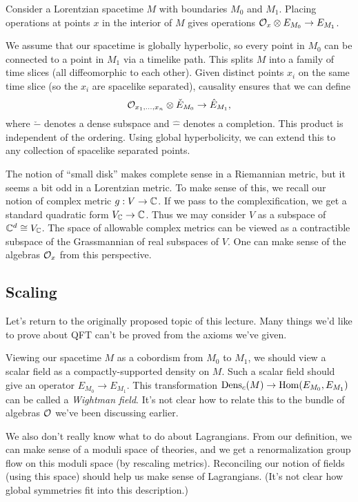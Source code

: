 Consider a Lorentzian spacetime $M$ with boundaries $M_0$ and $M_1$.
Placing operations at points $x$ in the interior of $M$ gives operations $\mathcal{O}_x \otimes E_{M_0} \to E_{M_1}$.

We assume that our spacetime is globally hyperbolic, so every point in $M_0$ can be connected to a point in $M_1$ via a timelike path.
This splits $M$ into a family of time slices (all diffeomorphic to each other).
Given distinct points $x_i$ on the same time slice (so the $x_i$ are spacelike separated), causality ensures that we can define
\[
	\mathcal{O}_{x_1, \dots, x_n} \otimes \check{E}_{M_0} \to \hat{E}_{M_1},
\]
where $\check{-}$ denotes a dense subspace and $\hat{-}$ denotes a completion.
This product is independent of the ordering.
Using global hyperbolicity, we can extend this to any collection of spacelike separated points.

The notion of ``small disk'' makes complete sense in a Riemannian metric, but it seems a bit odd in a Lorentzian metric.
To make sense of this, we recall our notion of complex metric $g: V \to \mathbb{C}$.
If we pass to the complexification, we get a standard quadratic form $V_{\mathbb{C}} \to \mathbb{C}$.
Thus we may consider $V$ as a subspace of $\mathbb{C}^d \cong V_{\mathbb{C}}$.
The space of allowable complex metrics can be viewed as a contractible subspace of the Grassmannian of real subspaces of $V$.
One can make sense of the algebras $\mathcal{O}_x$ from this perspective.

\subsection{Scaling}

Let's return to the originally proposed topic of this lecture.
Many things we'd like to prove about QFT can't be proved from the axioms we've given.

Viewing our spacetime $M$ as a cobordism from $M_0$ to $M_1$, we should view a scalar field as a compactly-supported density on $M$.
Such a scalar field should give an operator $E_{M_0} \to E_{M_1}$.
This transformation $\operatorname{Dens}_c(M) \to \operatorname{Hom}(E_{M_0}, E_{M_1})$ can be called a \emph{Wightman field}.
It's not clear how to relate this to the bundle of algebras $\mathcal{O}$ we've been discussing earlier.

We also don't really know what to do about Lagrangians.
From our definition, we can make sense of a moduli space of theories, and we get a renormalization group flow on this moduli space (by rescaling metrics).
Reconciling our notion of fields (using this space) should help us make sense of Lagrangians.
(It's not clear how global symmetries fit into this description.)

